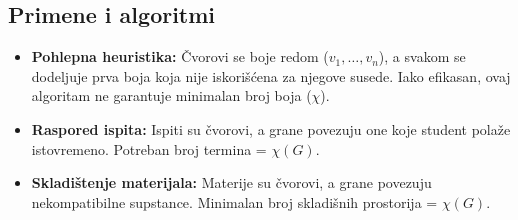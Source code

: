 \documentclass[a4paper,12pt]{article}
\numberwithin{algorithm}{section}
\theoremstyle{plain}
\theoremstyle{definition}
\theoremstyle{remark}
\begin{document}
\subsection*{Primene i algoritmi}
\begin{itemize}
    \item \textbf{Pohlepna heuristika:} Čvorovi se boje redom ($v_1, \dots, v_n$), a svakom se dodeljuje prva boja koja nije iskorišćena za njegove susede. Iako efikasan, ovaj algoritam ne garantuje minimalan broj boja ($\chi$).
    \item \textbf{Raspored ispita:} Ispiti su čvorovi, a grane povezuju one koje student polaže istovremeno. Potreban broj termina = $\chi(G)$.
    \item \textbf{Skladištenje materijala:} Materije su čvorovi, a grane povezuju nekompatibilne supstance. Minimalan broj skladišnih prostorija = $\chi(G)$.
\end{itemize}

\newpage
\tableofcontents
\end{document}
